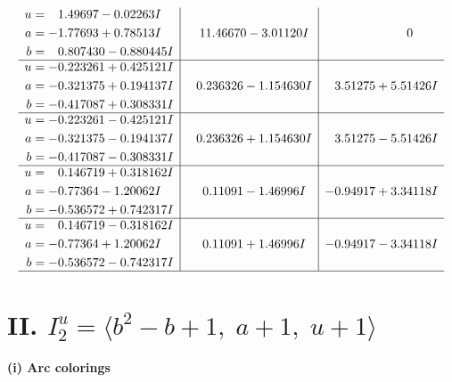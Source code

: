 \documentclass[1p]{elsarticle_modified}
\theoremstyle{definition}
\begin{document}
$$\begin{array}{c|c|c}
\begin{aligned}
u &= \phantom{-}1.49697 - 0.02263 I \\
a &= -1.77693 + 0.78513 I \\
b &= \phantom{-}0.807430 - 0.880445 I\end{aligned}
 & \phantom{-}11.46670 - 3.01120 I & \phantom{-0.000000 } 0 \\ \hline\begin{aligned}
u &= -0.223261 + 0.425121 I \\
a &= -0.321375 + 0.194137 I \\
b &= -0.417087 + 0.308331 I\end{aligned}
 & \phantom{-}0.236326 - 1.154630 I & \phantom{-}3.51275 + 5.51426 I \\ \hline\begin{aligned}
u &= -0.223261 - 0.425121 I \\
a &= -0.321375 - 0.194137 I \\
b &= -0.417087 - 0.308331 I\end{aligned}
 & \phantom{-}0.236326 + 1.154630 I & \phantom{-}3.51275 - 5.51426 I \\ \hline\begin{aligned}
u &= \phantom{-}0.146719 + 0.318162 I \\
a &= -0.77364 - 1.20062 I \\
b &= -0.536572 + 0.742317 I\end{aligned}
 & \phantom{-}0.11091 - 1.46996 I & -0.94917 + 3.34118 I \\ \hline\begin{aligned}
u &= \phantom{-}0.146719 - 0.318162 I \\
a &= -0.77364 + 1.20062 I \\
b &= -0.536572 - 0.742317 I\end{aligned}
 & \phantom{-}0.11091 + 1.46996 I & -0.94917 - 3.34118 I\\
 \hline 
 \end{array}$$\newpage\newpage\renewcommand{\arraystretch}{1}
\centering \section*{II. $I^u_{2}= \langle b^2- b+1,\;a+1,\;u+1 \rangle$}
\flushleft \textbf{(i) Arc colorings}\\
\end{document}
